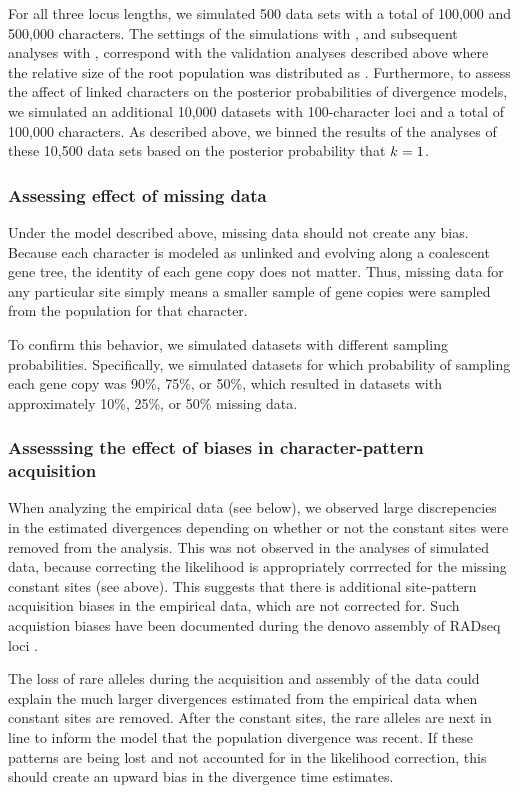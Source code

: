 For all three locus lengths, we simulated 500 data sets with a total of 100,000
and 500,000 characters.
The settings of the simulations with \simcoevolity, and subsequent analyses
with \ecoevolity, correspond with the validation analyses described above where
the relative size of the root population was distributed as .
Furthermore, to assess the affect of linked characters on the posterior
probabilities of divergence models, we simulated an additional 10,000 datasets
with 100-character loci and a total of 100,000 characters.
As described above, we binned the results of the analyses of these 10,500 data
sets based on the posterior probability that $k_{} = 1$.


\subsubsection{Assessing effect of missing data}
Under the model described above, missing data should not create any bias.
Because each character is modeled as unlinked and evolving along
a coalescent gene tree, the identity of each gene copy does not matter.
Thus, missing data for any particular site simply means a smaller sample of
gene copies were sampled from the population for that character.

To confirm this behavior, we simulated datasets with different sampling
probabilities.
Specifically, we simulated datasets for which probability of sampling each gene
copy was 90\%, 75\%, or 50\%, which resulted in datasets with approximately
10\%, 25\%, or 50\% missing data.

\subsubsection{Assesssing the effect of biases in character-pattern acquisition}
When analyzing the empirical data (see below),
we observed large discrepencies in the estimated divergences depending on
whether or not the constant sites were removed from the analysis.
This was not observed in the analyses of simulated data, because correcting the
likelihood is appropriately corrrected for the missing constant sites (see
above).
This suggests that there is additional site-pattern acquisition biases in the
empirical data, which are not corrected for.
Such acquistion biases have been documented during the denovo assembly of
RADseq loci \citep{Harvey2015,Linck2017}.

The loss of rare alleles during the acquisition and assembly of the data could
explain the much larger divergences estimated from the empirical data when
constant sites are removed.
After the constant sites, the rare alleles are next in line to inform the model
that the population divergence was recent.
If these patterns are being lost and not accounted for in the likelihood
correction, this should create an upward bias in the divergence time estimates.


